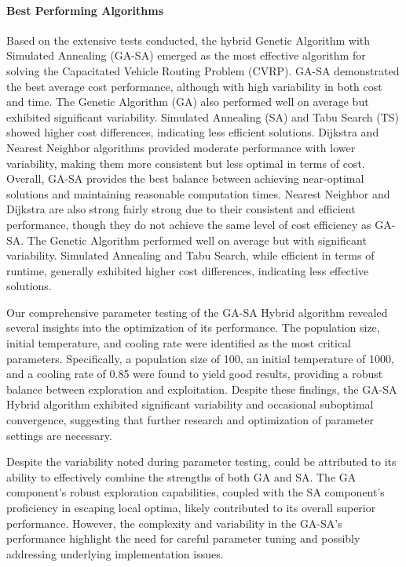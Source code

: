 \documentclass{article}
\begin{document}
    \paragraph{Best Performing Algorithms}
    Based on the extensive tests conducted, the hybrid Genetic Algorithm with Simulated Annealing (GA-SA) emerged as the most effective algorithm for solving the Capacitated Vehicle Routing Problem (CVRP). GA-SA demonstrated the best average cost performance, although with high variability in both cost and time. The Genetic Algorithm (GA) also performed well on average but exhibited significant variability. Simulated Annealing (SA) and Tabu Search (TS) showed higher cost differences, indicating less efficient solutions. Dijkstra and Nearest Neighbor algorithms provided moderate performance with lower variability, making them more consistent but less optimal in terms of cost. Overall, GA-SA provides the best balance between achieving near-optimal solutions and maintaining reasonable computation times. Nearest Neighbor and Dijkstra are also strong fairly strong due to their consistent and efficient performance, though they do not achieve the same level of cost efficiency as GA-SA. The Genetic Algorithm performed well on average but with significant variability. Simulated Annealing and Tabu Search, while efficient in terms of runtime, generally exhibited higher cost differences, indicating less effective solutions.

    Our comprehensive parameter testing of the GA-SA Hybrid algorithm revealed several insights into the optimization of its performance. The population size, initial temperature, and cooling rate were identified as the most critical parameters. Specifically, a population size of 100, an initial temperature of 1000, and a cooling rate of 0.85 were found to yield good results, providing a robust balance between exploration and exploitation. Despite these findings, the GA-SA Hybrid algorithm exhibited significant variability and occasional suboptimal convergence, suggesting that further research and optimization of parameter settings are necessary.

    Despite the variability noted during parameter testing, could be attributed to its ability to effectively combine the strengths of both GA and SA. The GA component's robust exploration capabilities, coupled with the SA component's proficiency in escaping local optima, likely contributed to its overall superior performance. However, the complexity and variability in the GA-SA's performance highlight the need for careful parameter tuning and possibly addressing underlying implementation issues.
\end{document}
